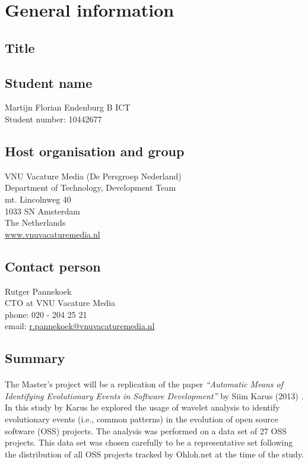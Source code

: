 \section{General information}
\subsection{Title}
\theTitle

\subsection{Student name}
Martijn Florian Endenburg B ICT \\
Student number: 10442677

\subsection{Host organisation and group}
VNU Vacature Media (De Persgroep Nederland) \\
Department of Technology, Development Team \\
mt. Lincolnweg 40 \\
1033 SN Amsterdam \\
The Netherlands \\
\href{http://www.vnuvacaturemedia.nl}{www.vnuvacaturemedia.nl}

\subsection{Contact person}
Rutger Pannekoek \\
CTO at VNU Vacature Media \\
phone: 020 - 204 25 21 \\
email:
\href{mailto:r.pannekoek@vnuvacaturemedia.nl}{r.pannekoek@vnuvacaturemedia.nl}

\subsection{Summary}
\paragraph{}
The Master's project will be a replication of the paper \emph{``Automatic Means
of Identifying Evolutionary Events in Software Development''} by Siim Karus
(2013) \cite{karus2013}. In this study by Karus he explored the usage of wavelet
analysis to identify evolutionary events (i.e., common patterns) in the
evolution of open source software (OSS) projects. The analysis was performed on
a data set of 27 OSS projects. This data set was chosen carefully to be a
representative set following the distribution of all OSS projects tracked by
Ohloh.net at the time of the study.
\\


